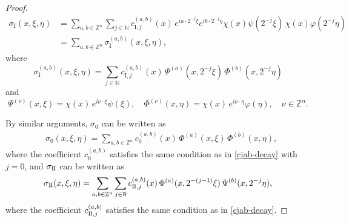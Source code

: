 \documentclass[12pt]{amsart}
\numberwithin{equation}{section}
\theoremstyle{plain}
\theoremstyle{definition}
\newcommand{\N}{\mathbb{N}}
\newcommand{\Z}{\mathbb{Z}}
\newcommand{\RomI}{\mathrm{I}}
\newcommand{\II}{\mathrm{I}\hspace{-0.5pt}\mathrm{I}}
\begin{document}
\begin{proof}
\begin{align*}
\sigma_{\RomI} (x, \xi, \eta)
&=
\sum_{a, b \in \Z^n}
\sum_{j \in \N }
c_{\RomI, j}^{(a, b)} (x) \,
e^{i a \cdot 2^{-j} \xi} e^{i b \cdot 2^{-j}\eta}
\chi(x) \psi (2^{-j} \xi) \,
\chi(x) \varphi (2^{-j} \eta) 
\\
&
=
\sum_{a, b \in \Z^n}
\sigma_{\RomI}^{(a, b)} (x, \xi, \eta), 
\end{align*}
where 
\[
\sigma_{\RomI}^{(a, b)} (x, \xi, \eta) =
\sum_{j \in \N }
c_{\RomI, j}^{(a, b)} (x) \,
\Psi^{(a)} (x, 2^{-j} \xi) \,
\Phi^{(b)} (x, 2^{-j} \eta)
\]
and 
\begin{equation*}%
\Psi^{(\nu)} (x, \xi)
= \chi(x) \, e^{i \nu \cdot \xi} \psi (\xi), 
\quad  
\Phi^{(\nu)} (x, \eta) 
= \chi(x) \, e^{i \nu \cdot \eta} \varphi (\eta),
\quad
\nu \in \Z^n .
\end{equation*}


By similar arguments, 
$\sigma_{0}$ can be written as
\begin{align*}
&
\sigma_{0} (x, \xi, \eta)
=
\sum_{a, b \in \Z^n}
c_{0}^{(a, b)} (x) \,
\Phi^{(a)} (x, \xi) \,
\Phi^{(b)} (x, \eta) ,
\end{align*}
where the coefficient
$c_{0}^{(a, b)}$ 
satisfies the same condition as in \eqref{cjab-decay} with $j=0$,
and
$\sigma_{\II}$ can be written as
\begin{align*}
\sigma_{\II} (x, \xi, \eta)
=
\sum_{a, b \in \Z^n}
\sum_{j \in \N }
c_{\II, j}^{(a, b)} (x) \,
\Phi^{(a)} (x, 2^{-(j-1)} \xi) \,
\Psi^{(b)} (x, 2^{-j} \eta) ,
\end{align*}
where the coefficient 
$c_{\II, j}^{(a, b)}$ 
satisfies the same condition as in \eqref{cjab-decay}. 



\end{proof}
\end{document}
